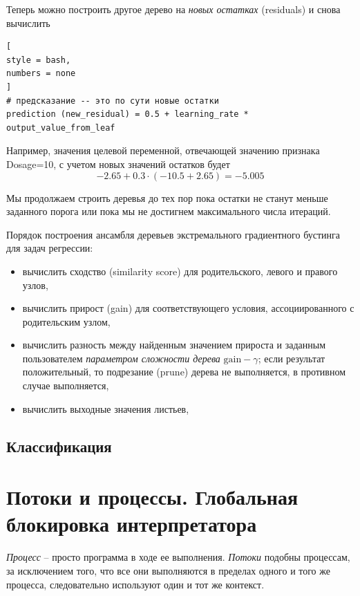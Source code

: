 \documentclass[%
	11pt,
	a4paper,
	utf8,
		]{article}
\begin{document}
Теперь можно построить другое дерево на \emph{новых остатках} (residuals) и снова вычислить
\begin{lstlisting}[
style = bash,
numbers = none	
]
# предсказание -- это по сути новые остатки
prediction (new_residual) = 0.5 + learning_rate * output_value_from_leaf
\end{lstlisting}

Например, значения целевой переменной, отвечающей значению признака Dosage=10, с учетом новых значений остатков будет
$$
-2.65 + 0.3 \cdot (-10.5 + 2.65) = -5.005
$$

Мы продолжаем строить деревья до тех пор пока остатки не станут меньше заданного порога или пока мы не достигнем максимального числа итераций.

Порядок построения ансамбля деревьев экстремального градиентного бустинга для задач регрессии:
\begin{itemize}
	\item вычислить сходство (similarity score) для родительского, левого и правого узлов,
	
	\item вычислить прирост (gain) для соответствующего условия, ассоциированного с родительским узлом,
	
	\item вычислить разность между найденным значением прироста и заданным пользователем \emph{параметром сложности дерева} $ \text{gain} - \gamma $; если результат положительный, то подрезание (prune) дерева не выполняется, в противном случае выполняется,
	
	\item вычислить выходные значения листьев,
\end{itemize}

\subsection{Классификация}



\section{Потоки и процессы. Глобальная блокировка интерпретатора}

\emph{Процесс} -- просто программа в ходе ее выполнения. \emph{Потоки} подобны процессам, за исключением того, что все они выполняются в пределах одного и того же процесса, следовательно используют один и тот же контекст. 
\end{document}
